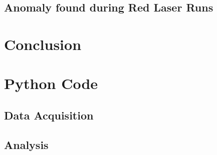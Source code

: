 \documentclass[%
reprint,
amsmath,amssymb,
aps,
]{revtex4-2}
\begin{document}
		\subsection{Anomaly found during Red Laser Runs}

	\section{Conclusion}
		
		
	\newpage
		
	\newpage
	\appendix
		
	\section{Python Code}
	
		\subsection{Data Acquisition}
		
		\subsection{Analysis}
		
\end{document}
